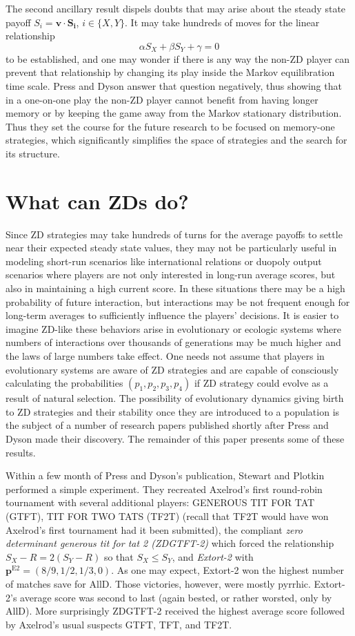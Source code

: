 The second ancillary result dispels doubts that may arise about the steady state payoff $S_i = \mathbf{v}\cdot \mathbf{S_i}$, $i \in \{X, Y\}$. It may take hundreds of moves for the linear relationship
\[
\alpha S_X + \beta S_Y + \gamma = 0
\]
to be established, and one may wonder if there is any way the non-ZD player can prevent that relationship by changing its play inside the Markov equilibration time scale. Press and Dyson answer that question negatively, thus showing that in a one-on-one play the non-ZD player cannot benefit from having longer memory or by keeping the game away from the Markov stationary distribution. Thus they set the course for the future research to be focused on memory-one strategies, which significantly simplifies the space of strategies and the search for its structure.

\section{What can ZDs do?}

Since ZD strategies may take hundreds of turns for the average payoffs to settle near their expected steady state values, they may not be particularly useful in modeling short-run scenarios like international relations or duopoly output scenarios where players are not only interested in long-run average scores, but also in maintaining a high current score. In these situations there may be a high probability of future interaction, but interactions may be not frequent enough for long-term averages to sufficiently influence the players' decisions. It is easier to imagine ZD-like these behaviors arise in evolutionary or ecologic systems where numbers of interactions over thousands of generations may be much higher and the laws of large numbers take effect. One needs not assume that players in evolutionary systems are aware of ZD strategies and are capable of consciously calculating the probabilities $(p_1, p_2, p_3, p_4)$ if ZD strategy could evolve as a result of natural selection. The possibility of evolutionary dynamics giving birth to ZD strategies and their stability once they are introduced to a population is the subject of a number of research papers published shortly after Press and Dyson made their discovery. The remainder of this paper presents some of these results.

Within a few month of Press and Dyson's publication, Stewart and Plotkin \cite{Stewart26062012} performed a simple experiment. They recreated Axelrod's first round-robin tournament with several additional players: GENEROUS TIT FOR TAT (GTFT), TIT FOR TWO TATS (TF2T) (recall that TF2T would have won Axelrod's first tournament had it been submitted), the compliant \textit{zero determinant generous tit for tat 2 (ZDGTFT-2)} which forced the relationship $S_X - R = 2(S_Y - R)$ so that $S_X \leq S_Y$, and \textit{Extort-2} with $\mathbf{p}^{\textrm{E2}} = (8/9, 1/2, 1/3, 0)$. As one may expect, Extort-2 won the highest number of matches save for AllD. Those victories, however, were mostly pyrrhic. Extort-2's average score was second to last (again bested, or rather worsted, only by AllD). More surprisingly ZDGTFT-2 received the highest average score followed by Axelrod's usual suspects GTFT, TFT, and TF2T. 

